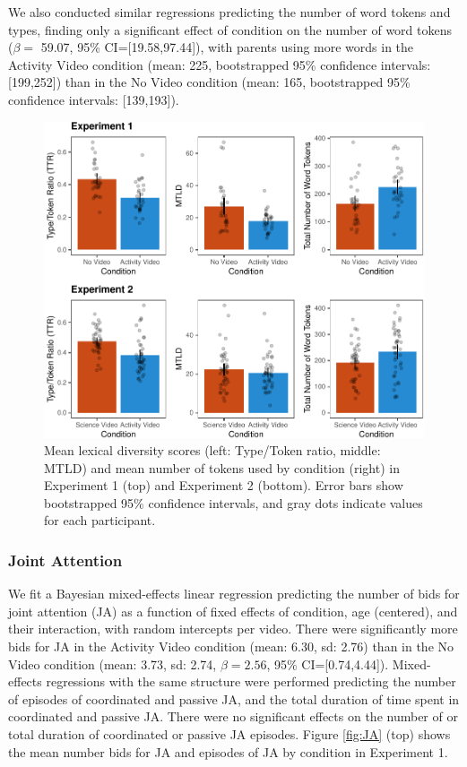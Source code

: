 \documentclass[man,floatsintext]{apa6}
\begin{document}
We also conducted similar regressions predicting the number of word tokens and types, finding only a significant effect of condition on the number of word tokens (\(\beta=\) 59.07, 95\% CI={[}19.58,97.44{]}), with parents using more words in the Activity Video condition (mean: 225, bootstrapped 95\% confidence intervals: {[}199,252{]}) than in the No Video condition (mean: 165, bootstrapped 95\% confidence intervals: {[}139,193{]}).

\begin{figure}[H]

{\centering \includegraphics{figs/fig-lexdiv-1} 

}

\caption{\label{fig:lexdiv} Mean lexical diversity scores (left: Type/Token ratio, middle: MTLD) and mean number of tokens used by condition (right) in Experiment 1 (top) and Experiment 2 (bottom). Error bars show bootstrapped 95\% confidence intervals, and gray dots indicate values for each participant.}\label{fig:fig-lexdiv}
\end{figure}

\hypertarget{joint-attention}{%
\subsubsection{Joint Attention}\label{joint-attention}}

We fit a Bayesian mixed-effects linear regression predicting the number of bids for joint attention (JA) as a function of fixed effects of condition, age (centered), and their interaction, with random intercepts per video.
There were significantly more bids for JA in the Activity Video condition (mean: 6.30, sd: 2.76) than in the No Video condition (mean: 3.73, sd: 2.74, \(\beta=2.56\), 95\% CI={[}0.74,4.44{]}).
Mixed-effects regressions with the same structure were performed predicting the number of episodes of coordinated and passive JA, and the total duration of time spent in coordinated and passive JA.
There were no significant effects on the number of or total duration of coordinated or passive JA episodes.
Figure \ref{fig:JA} (top) shows the mean number bids for JA and episodes of JA by condition in Experiment 1.
\end{document}
